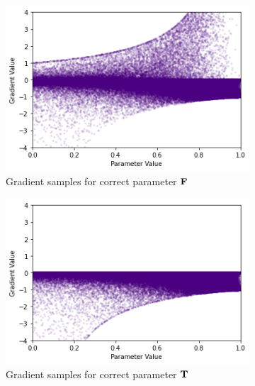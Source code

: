 \begin{figure}[ht]
    \centering
    \begin{subfigure}[b]{0.47\textwidth}
        \centering
        \includegraphics[width=\textwidth]{imgs/grad_ss_bce_falseparam_10dim.png}
        \caption{Gradient samples for correct parameter $\textbf{F}$}
        \label{fig:conjgrad10falsessbce}
    \end{subfigure}
    \begin{subfigure}[b]{0.47\textwidth}
        \centering
        \includegraphics[width=\textwidth]{imgs/grad_ss_bce_trueparam_10dim.png}
        \caption{Gradient samples for correct parameter $\textbf{T}$}
        \label{fig:conjgrad10truessbce}
    \end{subfigure}
    \begin{subfigure}[b]{0.47\textwidth}
        \centering

\end{subfigure}
\end{figure}

